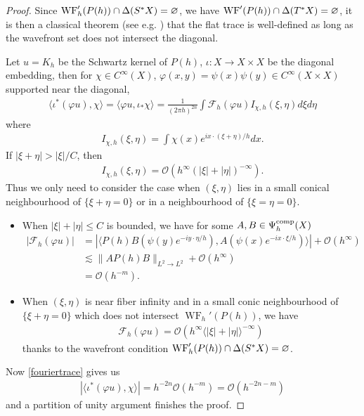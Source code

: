 \documentclass[reqno,12pt,letterpaper]{amsart}
\numberwithin{equation}{section}
\numberwithin{prop}{section}
\DeclareMathOperator{\WF}{WF}
\newcommand{\Fcal}{{\mathcal F}}
\newcommand{\Ocal}{{\mathcal O}}
\begin{document}
\begin{proof}
Since ${\rm WF}_h'(P(h))\cap \Delta(S^*X)=\varnothing$, we have ${\rm WF}'(P(h))\cap \Delta(T^*X)=\varnothing$,
it is then a classical theorem (see e.g. \cite[Theorem 8.2.4]{micro1}) that the flat trace is well-defined as long as the wavefront set does not intersect the diagonal. 

Let $u=K_h$ be the Schwartz kernel of $P(h)$, $\iota:X\to X\times X$ be the diagonal embedding, then for $\chi\in C^\infty(X)$, $\varphi(x,y)=\psi(x)\psi(y)\in C^\infty(X\times X)$ supported near the diagonal, 
\begin{align}\label{fouriertrace}
    \langle\iota^*(\varphi u), \chi \rangle=\langle \varphi u,\iota_*\chi\rangle=\frac{1}{(2\pi h)^{2n}}\int\Fcal_h(\varphi u)I_{\chi,h}(\xi,\eta)d\xi d\eta
\end{align}
where 
\begin{align*}
    I_{\chi,h}(\xi,\eta)=\int\chi(x)e^{ix\cdot(\xi+\eta)/h}dx.
\end{align*}
If $|\xi+\eta|>|\xi|/C$, then
\begin{align*}
    I_{\chi,h}(\xi,\eta)=\Ocal(h^\infty(|\xi|+|\eta|)^{-\infty}).
\end{align*}
Thus we only need to consider the case when $(\xi,\eta)$ lies in a small conical neighbourhood of $\{\xi+\eta=0\}$ or in a neighbourhood of $\{\xi=\eta=0\}$.

\begin{itemize}
    \item[(i)] When $|\xi|+|\eta|\leq C$ is bounded, we have for some $A,B\in\Psi^{\rm comp}_h(X)$
    \begin{align*}
        |\Fcal_h(\varphi u)|&=|\langle P(h)B(\psi(y)e^{-iy\cdot\eta/h}),  A(\psi(x)e^{-ix\cdot\xi/h})\rangle|+\Ocal(h^\infty)\\
        &\lesssim \|AP(h)B\|_{L^2\to L^2}+\Ocal(h^\infty)\\
        &=\Ocal(h^{-m}).
    \end{align*}
    \item[(ii)] When $(\xi,\eta)$ is near fiber infinity and in a small conic neighbourhood of $\{\xi+\eta=0\}$ which does not intersect $\WF_h'(P(h))$, we have
    \begin{align*}
         \Fcal_h(\varphi u)=\Ocal(h^\infty\langle |\xi|+|\eta|\rangle^{-\infty})
    \end{align*}
    thanks to the wavefront condition ${\rm WF}_h'(P(h))\cap \Delta(S^*X)=\varnothing$.
\end{itemize}
Now \eqref{fouriertrace} gives us 
\begin{align*}
       |\langle\iota^*(\varphi u), \chi \rangle|=h^{-2n}\Ocal(h^{-m})=\Ocal(h^{-2n-m})
\end{align*}
and a partition of unity argument finishes the proof.
\end{proof}
\end{document}
